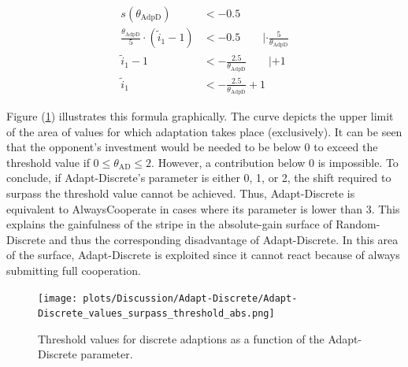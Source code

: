 \documentclass[11pt]{article}
\begin{document}
	\begin{equation}
	\begin{split}
		s(\theta_{\mathrm{AdpD}}) &< -0.5 \\
		\frac{\theta_{\mathrm{AdpD}}}{5} \cdot (\tilde{i}_1 - 1) &< -0.5 \qquad | \cdot \frac{5}{\theta_{\mathrm{AdpD}}} \\
		\tilde{i}_1 - 1 &< -\frac{2.5}{\theta_{\mathrm{AdpD}}} \qquad | + 1 \\
		\tilde{i}_1 &< -\frac{2.5}{\theta_{\mathrm{AdpD}}} + 1
	\end{split}
	\label{eq:adpd_inequality}
\end{equation}

	\noindent
	Figure (\ref{fig:surpass_theshold_abs}) illustrates this formula graphically.
	The curve depicts the upper limit of the area of values for which adaptation takes place (exclusively).
	It can be seen that the opponent's investment would be needed to be below 0 to exceed the threshold value if $0 \le \theta_{\mathrm{AD}} \le 2$.
	However, a contribution below 0 is impossible.
	To conclude, if Adapt-Discrete's parameter is either 0, 1, or 2, the shift required to surpass the threshold value cannot be achieved.
	Thus, Adapt-Discrete is equivalent to AlwaysCooperate in cases where its parameter is lower than 3.
	This explains the gainfulness of the stripe in the absolute-gain surface of Random-Discrete and thus the corresponding disadvantage of Adapt-Discrete.
	In this area of the surface, Adapt-Discrete is exploited since it cannot react because of always submitting full cooperation.
	\begin{figure}[h]
		\begin{center}
			\texttt{[image: plots/Discussion/Adapt-Discrete/Adapt-Discrete\_values\_surpass\_threshold\_abs.png]}
		\end{center}
		\caption{Threshold values for discrete adaptions as a function of the Adapt-Discrete parameter.}
		\label{fig:surpass_theshold_abs}
	\end{figure}
\end{document}
